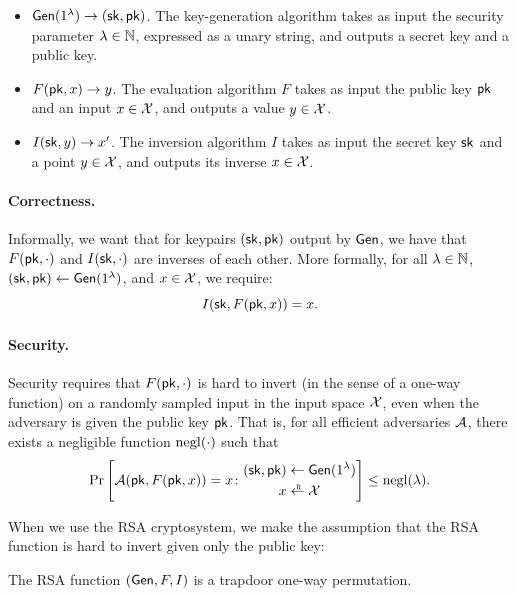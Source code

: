 \begin{itemize}
  \item $\mathsf{Gen}(1^\lambda) \to ({\mathsf{sk}}, \mathsf{pk})$.
        The key-generation algorithm takes as input the security parameter $\lambda \in \mathbb{N}$,
        expressed as a unary string, and outputs a secret key and a public key.
  \item $F(\mathsf{pk}, x) \to y$.
        The evaluation algorithm $F$ takes as input the
        public key $\mathsf{pk}$ and an input $x \in \mathcal{X}$, and outputs 
        a value $y \in \mathcal{X}$.
  \item $I({\mathsf{sk}}, y) \to x'$.
        The inversion algorithm $I$ takes as input the secret key ${\mathsf{sk}}$
        and a point $y \in \mathcal{X}$, and outputs its inverse $x \in \mathcal{X}$.
\end{itemize}

\paragraph{Correctness.}
Informally, we want that for keypairs $({\mathsf{sk}}, \mathsf{pk})$ output by $\mathsf{Gen}$,
we have that $F(\mathsf{pk}, \cdot)$ and $I({\mathsf{sk}}, \cdot)$ are inverses of each other.
More formally, for all $\lambda \in \mathbb{N}$, $({\mathsf{sk}}, \mathsf{pk}) \gets \mathsf{Gen}(1^\lambda)$, and $x \in \mathcal{X}$,
we require:
\[ I({\mathsf{sk}}, F(\mathsf{pk}, x))= x.\]

\paragraph{Security.}
Security requires that $F(\mathsf{pk}, \cdot)$ is hard to invert (in the sense of a one-way function)
on a randomly sampled input in the input space $\mathcal{X}$, even when the adversary 
is given the public key $\mathsf{pk}$.
That is, for all efficient adversaries $\mathcal{A}$, there exists a negligible function $\operatorname{negl}(\cdot)$
such that 
\[ \Pr\left[ 
\calA(\pk, F(\pk, x)) = x
\colon \begin{aligned}
  (\sk, \pk) &\gets \Gen(1^\lambda)\\
  x &\getsr \calX
\end{aligned}\right] \leq \negl(\lambda).\]

When we use the RSA cryptosystem, we make the assumption 
that the RSA function is hard to invert given only the public key:
\begin{defn}
The RSA function $(\mathsf{Gen}, F, I)$ is a trapdoor one-way permutation.
\end{defn}

